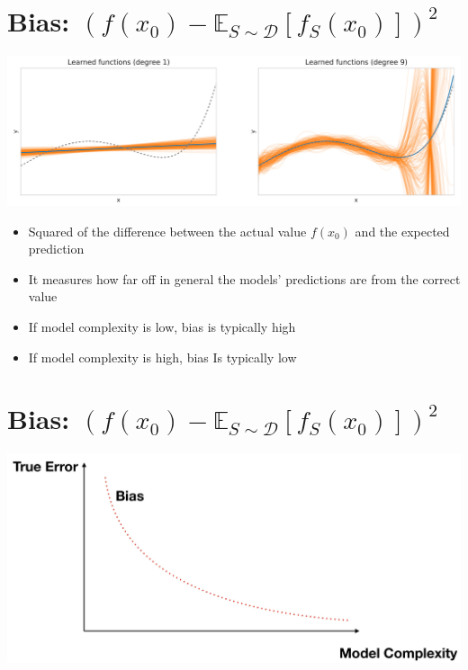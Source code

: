 \documentclass[10pt]{article}
\begin{document}
\section*{Bias: $\left(f\left(x_{0}\right)-\mathbb{E}_{S \sim \mathscr{D}}\left[f_{S}\left(x_{0}\right)\right]\right)^{2}$}
\begin{center}
\includegraphics[max width=\textwidth]{2023_12_30_442f876157646883c2c9g-23}
\end{center}

\begin{itemize}
  \item Squared of the difference between the actual value $f\left(x_{0}\right)$ and the expected prediction

  \item It measures how far off in general the models' predictions are from the correct value

  \item If model complexity is low, bias is typically high

  \item If model complexity is high, bias Is typically low

\end{itemize}

\section*{Bias: $\left(f\left(x_{0}\right)-\mathbb{E}_{S \sim \mathscr{D}}\left[f_{S}\left(x_{0}\right)\right]\right)^{2}$}
\begin{center}
\includegraphics[max width=\textwidth]{2023_12_30_442f876157646883c2c9g-24}
\end{center}
\end{document}
